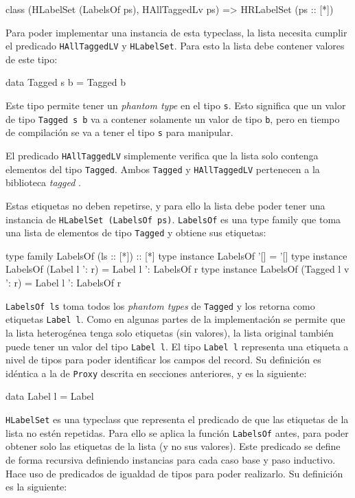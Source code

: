\begin{code}
class (HLabelSet (LabelsOf ps), HAllTaggedLv ps) =>
  HRLabelSet (ps :: [*])
\end{code}

Para poder implementar una instancia de esta typeclass, la lista necesita cumplir el predicado \texttt{HAllTaggedLV} y \texttt{HLabelSet}. Para esto la lista debe contener valores de este tipo:

\begin{code}
data Tagged s b = Tagged b
\end{code}

Este tipo permite tener un \textit{phantom type} en el tipo \texttt{s}. Esto significa que un valor de tipo \texttt{Tagged s b} va a contener solamente un valor de tipo \texttt{b}, pero en tiempo de compilación se va a tener el tipo \texttt{s} para manipular.

El predicado \texttt{HAllTaggedLV} simplemente verifica que la lista solo contenga elementos del tipo \texttt{Tagged}. Ambos \texttt{Tagged} y \texttt{HAllTaggedLV} pertenecen a la biblioteca \textit{tagged} \cite{HaskellTagged}.
 
Estas etiquetas no deben repetirse, y para ello la lista debe poder tener una instancia de \texttt{HLabelSet (LabelsOf ps)}. \texttt{LabelsOf} es una type family que toma una lista de elementos de tipo \texttt{Tagged} y obtiene sus etiquetas:

\begin{code}
type family LabelsOf (ls :: [*]) :: [*]
type instance LabelsOf '[] = '[]
type instance LabelsOf (Label l ': r) = 
  Label l ': LabelsOf r
type instance LabelsOf (Tagged l v ': r) = 
  Label l ': LabelsOf r
\end{code}

\texttt{LabelsOf ls} toma todos los \textit{phantom types} de \texttt{Tagged} y los retorna como etiquetas \texttt{Label l}. Como en algunas partes de la implementación se permite que la lista heterogénea tenga solo etiquetas (sin valores), la lista original también puede tener un valor del tipo \texttt{Label l}. El tipo \texttt{Label l} representa una etiqueta a nivel de tipos para poder identificar los campos del record. Su definición es idéntica a la de \texttt{Proxy} descrita en secciones anteriores, y es la siguiente:

\begin{code}
data Label l = Label
\end{code}

\texttt{HLabelSet} es una typeclass que representa el predicado de que las etiquetas de la lista no estén repetidas. Para ello se aplica la función \texttt{LabelsOf} antes, para poder obtener solo las etiquetas de la lista (y no sus valores). Este predicado se define de forma recursiva definiendo instancias para cada caso base y paso inductivo. Hace uso de predicados de igualdad de tipos para poder realizarlo. Su definición es la siguiente:

